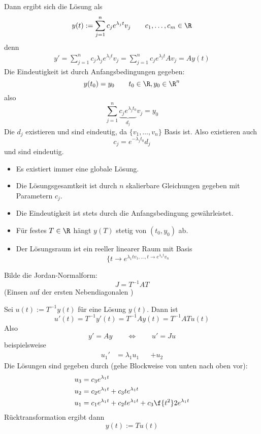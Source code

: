 \documentclass[a4paper,10pt]{scrartcl}
\begin{document}
\begin{seg}[Fall 1: ${v_1,\dotsc, v_n}$ bildet eine Basis aus Eigenvektoren: $Av_j = \lambda_j v_j$]
	Dann ergibt sich die Lösung als
	\[
		y(t) := \sum_{j=1}^n c_j e^{\lambda_j t} v_j
		\qquad c_1,\dotsc, c_m \in \R
	\]
	denn
	\begin{align*}
		y' = \sum_{j=1}^n c_j \lambda_j e^{\lambda_j t} v_j = \sum_{j=1}^n c_j e^{\lambda_j t} Av_j = A y(t)
	\end{align*}
	Die Eindeutigkeit ist durch Anfangsbedingungen gegeben:
	\[
		y(t_0) = y_0
		\qquad t_0 \in \R, y_0 \in \R^n
	\]
	also
	\[
		\sum_{j=1}^n \underbrace{c_j e^{\lambda_j t_0}}_{d_j} v_j = y_0
	\]
	Die $d_j$ existieren und sind eindeutig, da $\{v_1,\dotsc,v_n\}$ Basis ist.
	Also existieren auch
	\[
		c_j  = e^{-\lambda_j t_0} d_j
	\]
	und sind eindeutig.

	\begin{note}[Beobachtungen]
		\begin{itemize}
			\item
				Es existiert immer eine globale Lösung.
			\item
				Die Lösungsgesamtkeit ist durch $n$ skalierbare Gleichungen gegeben mit Parametern $c_j$.
			\item
				Die Eindeutigkeit ist stets durch die Anfangsbedingung gewährleistet.
			\item
				Für festes $T \in \R$ hängt $y(T)$ stetig von $(t_0, y_0)$ ab.
			\item
				Der Lösungsraum ist ein reeller linearer Raum mit Basis
				\[
					\{ t \to e^{\lambda_1 t v_1, \dotsc, t\to e^{\lambda_n t}v_n}
				\]
		\end{itemize}
	\end{note}
\end{seg}

\begin{seg}
	Bilde die Jordan-Normalform:
	\[
		J = T^{-1} A T
	\]
	(Einsen auf der ersten Nebendiagonalen \fixme[Beispielmatrix])

	Sei $u(t) := T^{-1} y(t)$ für eine Lösung $y(t)$.
	Dann ist
	\[
		u'(t) = T^{-1}y'(t) = T^{-1}Ay(t) = T^{-1}AT u(t)
	\]
	Also
	\[
		y' = Ay
		\qquad \iff \qquad
		u' = Ju
	\]
	beispielsweise	\fixme[Jordansystem]
	\begin{align*}
		u_1' &= \lambda_1 u_1& &+ u_2
	\end{align*}
	Die Lösungen sind gegeben durch (gehe Blockweise von unten nach oben vor):
	\begin{align*}
		u_3 &= c_3 e^{\lambda_1 t} \\
		u_2 &= c_2 e^{\lambda_1 t} + c_3 t e^{\lambda_1 t} \\
		u_1 &= c_1 e^{\lambda_1 t} + c_2 t e^{\lambda_1 t} + c_3 \f {t^2}2 e^{\lambda_1 t} \\
	\end{align*}
	Rücktransformation ergibt dann
	\[
		y(t) := T u(t)
	\]
\end{seg}
\end{document}
